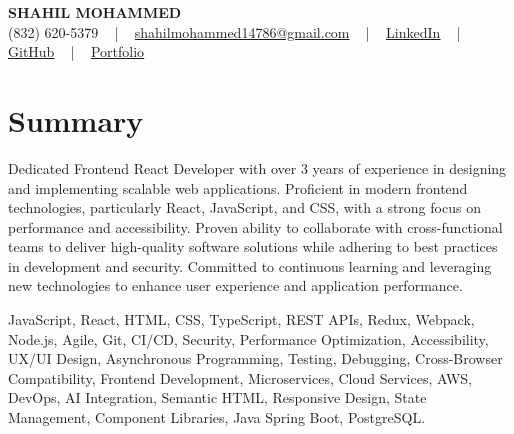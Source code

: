 \documentclass[letterpaper,10pt]{article}
\begin{document}
\begin{center}
    {\fontsize{14pt}{12pt}\selectfont \textbf{\MakeUppercase{Shahil Mohammed}}}\\ \vspace{2pt}
    \fontsize{10pt}{12pt}\selectfont (832) 620-5379 ~ | ~ \href{mailto:shahilmohammed14786@gmail.com}{shahilmohammed14786@gmail.com} ~ | ~  
    \href{https://www.linkedin.com/in/shahil-mohammed-9652931a1/}{\color{blue}\underline{LinkedIn}}  ~ | ~ 
    \href{https://github.com/freakbeast14}{\color{blue}\underline{GitHub}} ~ | ~ 
    \href{https://shahil-mohammed.netlify.app/}{\color{blue}\underline{Portfolio}}
    \vspace{-8pt}
\end{center}

\section{Summary}
\vspace{-2pt}\fontsize{8pt}{9pt}\selectfont
Dedicated Frontend React Developer with over 3 years of experience in designing and implementing scalable web applications. Proficient in modern frontend technologies, particularly React, JavaScript, and CSS, with a strong focus on performance and accessibility. Proven ability to collaborate with cross-functional teams to deliver high-quality software solutions while adhering to best practices in development and security. Committed to continuous learning and leveraging new technologies to enhance user experience and application performance.
 \vspace{-5pt}
 
{\fontsize{1pt}{1pt}\selectfont\color{white}
JavaScript, React, HTML, CSS, TypeScript, REST APIs, Redux, Webpack, Node.js, Agile, Git, CI/CD, Security, Performance Optimization, Accessibility, UX/UI Design, Asynchronous Programming, Testing, Debugging, Cross-Browser Compatibility, Frontend Development, Microservices, Cloud Services, AWS, DevOps, AI Integration, Semantic HTML, Responsive Design, State Management, Component Libraries, Java Spring Boot, PostgreSQL.
}
\vspace{-8pt}

\vspace{-2pt}
\end{document}
